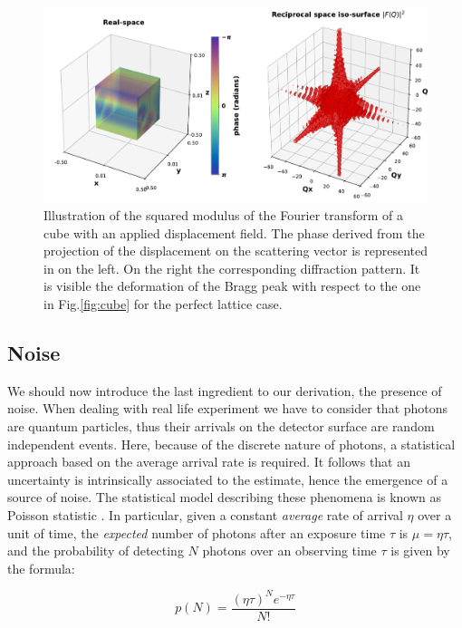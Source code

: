 \begin{figure}[H]
    \centering
    \includegraphics[width=\textwidth]{figures/Intro/cube_hihgstrain.pdf}
    \caption{Illustration of the squared modulus of the Fourier transform of a cube with an applied displacement field. 
    The phase derived from the projection of the displacement on the scattering vector is represented in on the left. On the 
    right the corresponding diffraction pattern. It is visible the deformation of the Bragg peak with respect to the 
    one in Fig.\ref{fig:cube} for the perfect lattice case. }
    \label{fig:cube_strain}
\end{figure}

\subsection{Noise}

We should now introduce the last ingredient to our derivation, the presence of noise. 
When dealing with real life experiment we have to consider that photons are quantum particles, thus their arrivals on 
the detector surface are random independent events. Here, because of the discrete nature of photons, a statistical approach 
based on the average arrival rate is required. It follows that an uncertainty is intrinsically associated to the estimate, 
hence the emergence of a source of noise. The statistical model describing these phenomena is known as Poisson 
statistic \cite{Poisson}. In particular, given a constant \textit{average} rate of arrival $\eta$ over a unit 
of time, the \textit{expected} number of photons after an exposure time $\tau$ is $\mu = \eta \tau$, and the probability 
of detecting $N$ photons over an observing time $\tau$ is given by the formula: 

\begin{equation}
    p(N) =  \frac{(\eta \tau)^N e^{-\eta \tau}}{N!}
    \label{eq:poisson}
\end{equation}

